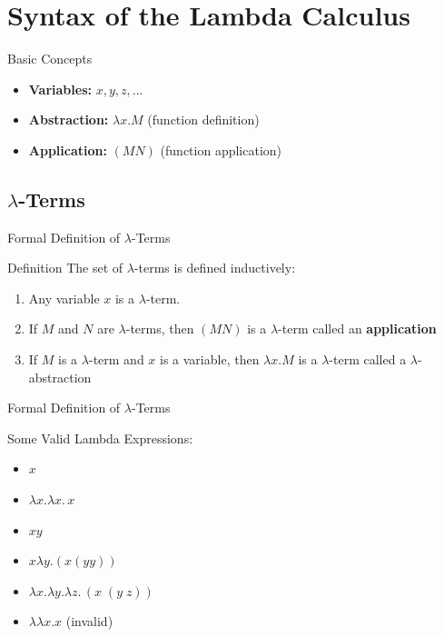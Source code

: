 \documentclass{beamer}
\begin{document}
\section{Syntax of the Lambda Calculus}
\begin{frame}{Basic Concepts}
  \begin{itemize}
    \item \textbf{Variables:} $x, y, z, \dots$
    \item \textbf{Abstraction:} $\lambda x.M$ (function definition)
    \item \textbf{Application:} $(MN)$ (function application)
  \end{itemize}
\end{frame}

\subsection{$\lambda$-Terms}
\begin{frame}{Formal Definition of $\lambda$-Terms}
  \begin{block}{Definition}
    The set of $\lambda$-terms is defined inductively:
    \begin{enumerate}
      \item Any variable $x$ is a $\lambda$-term.
      \item If $M$ and $N$ are $\lambda$-terms, then $(M N)$ is a $\lambda$-term called an \textbf{application}
      \item If $M$ is a $\lambda$-term and $x$ is a variable, then $\lambda x.M$ is a $\lambda$-term called a $\lambda$-abstraction
    \end{enumerate}
  \end{block}
\end{frame}

\begin{frame}{Formal Definition of $\lambda$-Terms}
  \begin{block}{Some Valid Lambda Expressions:}
  \begin{itemize}
      \item $x$
      \item $\lambda x.\lambda x.\,x$ 
      \item $xy$
      \item $x\lambda y.(x(yy))$
      \item $\lambda x.\lambda y.\lambda z.\,(x\;(y\;z))$
      \item $\lambda\lambda x.x$ (invalid)
  \end{itemize}
  \end{block}
\end{frame}
\end{document}
